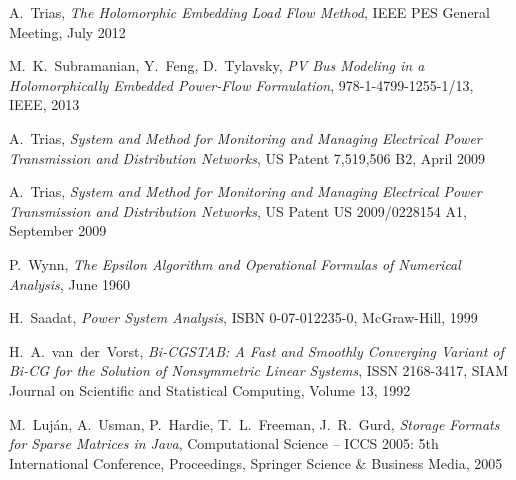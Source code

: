 \begin{thebibliography}{1}
	A.~Trias, \emph{The Holomorphic Embedding Load Flow Method}, IEEE PES General Meeting, July 2012
	
	M.~K.~Subramanian, Y.~Feng, D.~Tylavsky, \emph{PV Bus Modeling in a Holomorphically Embedded Power-Flow Formulation}, 978-1-4799-1255-1/13, IEEE, 2013
	
	A.~Trias, \emph{System and Method for Monitoring and Managing Electrical Power Transmission and Distribution Networks}, US Patent 7,519,506 B2, April 2009
	
	A.~Trias, \emph{System and Method for Monitoring and Managing Electrical Power Transmission and Distribution Networks}, US Patent US 2009/0228154 A1, September 2009
				
	P.~Wynn, \emph{The Epsilon Algorithm and Operational Formulas of Numerical Analysis}, June 1960
	
	H.~Saadat, \emph{Power System Analysis}, ISBN 0-07-012235-0, McGraw-Hill, 1999
	
	H.~A.~van~der~Vorst, \emph{Bi-CGSTAB: A Fast and Smoothly Converging Variant of Bi-CG for the Solution of Nonsymmetric Linear Systems}, ISSN 2168-3417, SIAM Journal on Scientific and Statistical Computing, Volume 13, 1992
	
	M.~Luján, A.~Usman, P.~Hardie, T.~L.~Freeman, J.~R.~Gurd, \emph{Storage Formats for Sparse Matrices in Java}, Computational Science -- ICCS 2005: 5th International Conference, Proceedings, Springer Science \& Business Media, 2005
\end{thebibliography}